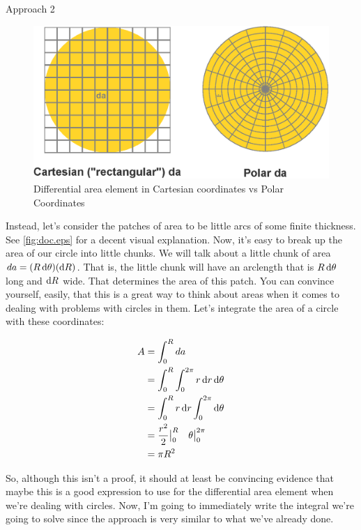 \begin{homeworkProblem}
\begin{homeworkSection}{Approach 2}
				\begin{figure}%
				\centering
				\includegraphics[width=.65\columnwidth]{./img/cartvspolar.eps}%
				\caption{Differential area element in Cartesian coordinates vs Polar Coordinates}%
				\label{fig:cartvspolar.eps}%
				\end{figure}

        Instead, let's consider the patches of area to be little arcs of
        some finite thickness. See \ref{fig:doc.eps} for a decent visual
        explanation.  Now, it's easy to break up the area of our circle
        into little chunks. We will talk about a little chunk of area
        $da = (R \mathop{}\!\mathrm{d} \theta)(\mathop{}\!\mathrm{d} R)$. That is, the little chunk will
        have an arclength that is $R \mathop{}\!\mathrm{d} \theta$ long and $\mathop{}\!\mathrm{d} R$
        wide. That determines the area of this patch. You can convince
        yourself, easily, that this is a great way to think about areas
        when it comes to dealing with problems with circles in them.
        Let's integrate the area of a circle with these coordinates:

        \begin{align}
            A &= \int_0^R da \nonumber \\
            &=  \int_0^R \int_0^{2\pi} r \mathop{}\!\mathrm{d} r \mathop{}\!\mathrm{d} \theta
            \nonumber \\
            &= \int_0^R r \mathop{}\!\mathrm{d} r \int_0^{2\pi} \mathop{}\!\mathrm{d} \theta \nonumber \\
            &= \frac{r^2}{2}\big|_0^R \quad \theta\big|_0^{2\pi}
            \nonumber \\
            &= \pi R^2 \nonumber 
        \end{align}

        So, although this isn't a proof, it should at least be
        convincing evidence that maybe this is a good expression to use
        for the differential area element when we're dealing with
        circles. Now, I'm going to immediately write the integral we're
        going to solve since the approach is very similar to what we've
        already done.


\end{homeworkSection}
\end{homeworkProblem}
